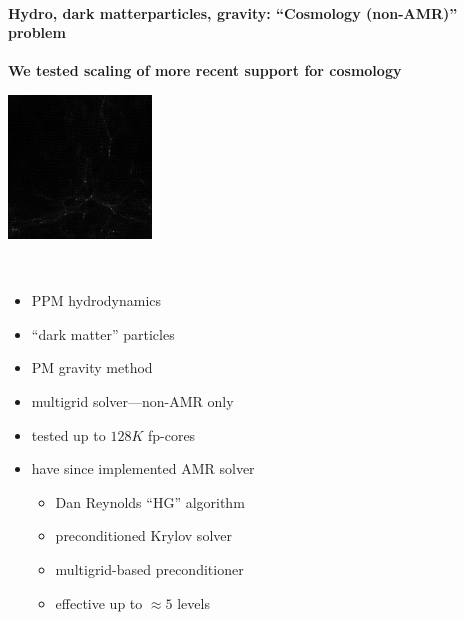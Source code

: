 
\begin{frame}[fragile]
 \secframetitle{\ssScaling}
\framesubtitle{Hydro, dark matterparticles, gravity: ``Cosmology (non-AMR)'' problem}

\textbf{We tested scaling of more recent support for cosmology}

\begin{minipage}{1.5in}
  \vspace{0.2in}
  \includegraphics[width=1.5in]{Images/Cosmo/dark-20.png} \\
\end{minipage} \
\begin{minipage}{2.75in}
  \vspace {0.2in}
  \begin{itemize}
  \item PPM hydrodynamics
  \item ``dark matter'' particles
  \item PM gravity method
  \item multigrid solver---non-AMR only
   \item tested up to $128K$ fp-cores
  \item have since implemented AMR solver
    \begin{itemize}
      \item Dan Reynolds ``HG'' algorithm
    \item preconditioned Krylov solver
    \item multigrid-based preconditioner
    \item effective up to $\approx 5$ levels
    \end{itemize}
  \end{itemize}
\end{minipage}
\end{frame}

